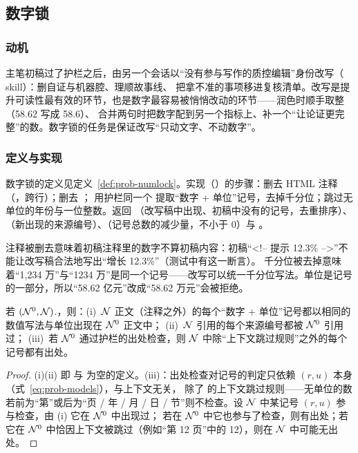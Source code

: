 \subsection{数字锁}
\label{sec:guards-numlock}

\subsubsection{动机}

主笔初稿过了护栏之后，由另一个会话以“没有参与写作的质控编辑”身份改写（ skill）：删自证与机器腔、理顺故事线、
把拿不准的事项移进复核清单。改写是提升可读性最有效的环节，也是数字最容易被悄悄改动的环节——润色时顺手取整（58.62 写成 58.6）、
合并两句时把数字配到另一个指标上、补一个“让论证更完整”的数。数字锁的任务是保证改写“只动文字、不动数字”。

\subsubsection{定义与实现}

数字锁的定义见定义~\ref{def:prob-numlock}。实现（）的步骤：删去 HTML 注释（，跨行）；删去 \code{[S编号]}；
用护栏同一个  提取“数字 + 单位”记号，去掉千分位；跳过无单位的年份与一位整数。返回
（改写稿中出现、初稿中没有的记号，去重排序）、（新出现的来源编号）、（记号总数的减少量，不小于 0）与 。

注释被删去意味着初稿注释里的数字不算初稿内容：初稿“<!-- 提示 12.3\% -->”不能让改写稿合法地写出“增长 12.3\%”（测试中有这一断言）。
千分位被去掉意味着“1,234 万”与“1234 万”是同一个记号——改写可以统一千分位写法。单位是记号的一部分，所以“58.62 亿元”改成“58.62 万元”会被拒绝。

\begin{proposition}[数字锁保证什么]
\label{prop:guards-numlock}
若 $(\mathcal{N}^0,\mathcal{N})$.，则：(i)~$\mathcal{N}$ 正文（注释之外）的每个“数字 + 单位”记号都以相同的数值写法与单位出现在 $\mathcal{N}^0$ 正文中；
(ii)~$\mathcal{N}$ 引用的每个来源编号都被 $\mathcal{N}^0$ 引用过；
(iii)~若 $\mathcal{N}^0$ 通过护栏的出处检查，则 $\mathcal{N}$ 中除“上下文跳过规则”之外的每个记号都有出处。
\end{proposition}
\begin{proof}
(i)(ii) 即  与  为空的定义。(iii)：出处检查对记号的判定只依赖 $(r,u)$ 本身（式~\eqref{eq:prob-models}），与上下文无关，
除了  的上下文跳过规则——无单位的数若前为“第”或后为“页 / 年 / 月 / 日 / 节”则不检查。设 $\mathcal{N}$ 中某记号 $(r,u)$ 参与检查，由 (i) 它在 $\mathcal{N}^0$ 中出现过；
若在 $\mathcal{N}^0$ 中它也参与了检查，则有出处；若它在 $\mathcal{N}^0$ 中恰因上下文被跳过（例如“第 12 页”中的 12），则在 $\mathcal{N}$ 中可能无出处。
\end{proof}


